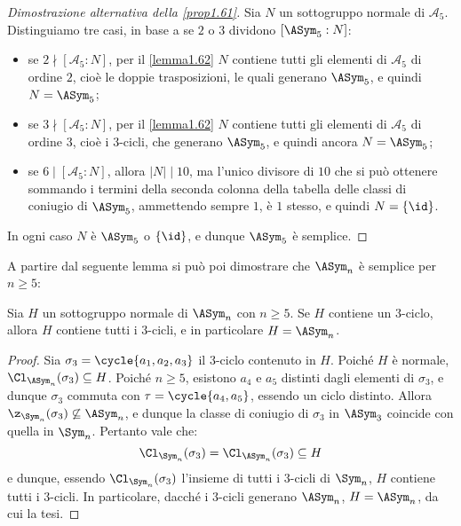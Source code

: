 \documentclass[11pt]{scrartcl}
\begin{document}
	\begin{proof}[Dimostrazione alternativa della \autoref{prop1.61}]
		Sia $N$ un sottogruppo normale di $\mathcal{A}_5$.
		Distinguiamo tre casi, in base a se $2$ o $3$ dividono $[\ASym_5 : N]$:
		\begin{itemize}
			\item se $2 \nmid [\mathcal{A}_5:N]$, per il \autoref{lemma1.62}
			$N$ contiene tutti gli elementi di 
			$\mathcal{A}_5$ di ordine $2$, cioè le doppie trasposizioni, le quali
			generano $\ASym_5$, e quindi $N = \ASym_5$;
			\item se $3\nmid [\mathcal{A}_5:N]$, per il \autoref{lemma1.62}
			$N$ contiene tutti gli elementi di 
			$\mathcal{A}_5$ di ordine $3$, cioè i $3$-cicli, che generano
			$\ASym_5$, e quindi ancora $N = \ASym_5$;
			\item se $6 \mid [\mathcal{A}_5:N]$, allora $\lvert N \rvert \mid 10$, ma l'unico
			divisore di $10$ che si può ottenere sommando i termini della seconda
			colonna della tabella delle classi di coniugio di $\ASym_5$, ammettendo
			sempre $1$, è $1$ stesso, e quindi $N = \{\id\}$.
		\end{itemize}
		In ogni caso $N$ è $\ASym_5$ o $\{\id\}$, e dunque $\ASym_5$ è semplice.
	\end{proof}
	
	A partire dal seguente lemma si può poi dimostrare che $\ASym_n$ è semplice per $n \geq 5$:
	
	\begin{lemma}
		\label{lemma1.79}
		Sia $H$ un sottogruppo normale di $\ASym_n$ con $n \geq 5$. Se $H$ contiene un $3$-ciclo,
		allora $H$ contiene tutti i $3$-cicli, e in particolare $H = \ASym_n$.
	\end{lemma}
	
	\begin{proof}
		Sia $\sigma_3 = \cycle{a_1, a_2, a_3}$ il $3$-ciclo contenuto in $H$. Poiché $H$ è normale,
		$\Cl_{\ASym_n}(\sigma_3) \subseteq H$. Poiché $n \geq 5$, esistono $a_4$ e $a_5$ distinti dagli elementi di $\sigma_3$, e dunque $\sigma_3$ commuta con $\tau = \cycle{a_4, a_5}$, essendo un ciclo distinto. Allora $\z_{\Sym_n}(\sigma_3) \not\subseteq \ASym_n$, e dunque la classe di coniugio di
		$\sigma_3$ in $\ASym_3$ coincide con quella in $\Sym_n$. Pertanto vale che:
		\[ \Cl_{\Sym_n}(\sigma_3) = \Cl_{\ASym_n}(\sigma_3) \subseteq H \]
		e dunque, essendo $\Cl_{\Sym_n}(\sigma_3)$ l'insieme di tutti i $3$-cicli di
		$\Sym_n$, $H$ contiene tutti i $3$-cicli. In particolare, dacché i $3$-cicli
		generano $\ASym_n$, $H = \ASym_n$, da cui la tesi.
	\end{proof}
	
\end{document}

